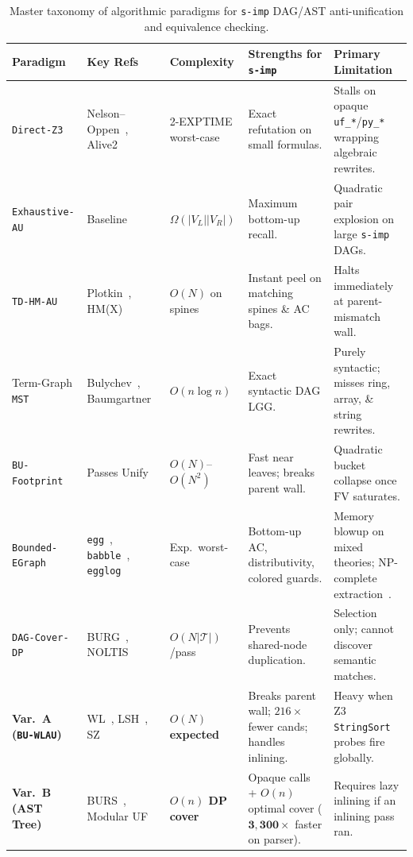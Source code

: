 \documentclass[11pt,a4paper]{article}
\begin{document}
\begin{table}[!htbp]
\centering
\caption{Master taxonomy of algorithmic paradigms for \texttt{s-imp} DAG/AST anti-unification and equivalence checking.}
\label{tab:taxonomy}
\footnotesize
\begin{tabularx}{\linewidth}{@{}p{2.9cm}p{2.5cm}p{2.2cm}p{3.5cm}X@{}}
\toprule
\textbf{Paradigm} & \textbf{Key Refs} & \textbf{Complexity} & \textbf{Strengths for \texttt{s-imp}} & \textbf{Primary Limitation} \\
\midrule
\texttt{Direct-Z3} & Nelson--Oppen~\cite{nelson1979}, Alive2~\cite{lopes2021} & 2-EXPTIME worst-case & Exact refutation on small formulas. & Stalls on opaque \texttt{uf\_*}/\texttt{py\_*} wrapping algebraic rewrites. \\
\texttt{Exhaustive-AU} & Baseline & $\Omega(|V_L||V_R|)$ & Maximum bottom-up recall. & Quadratic pair explosion on large \texttt{s-imp} DAGs. \\
\texttt{TD-HM-AU} & Plotkin~\cite{plotkin1970}, HM(X)~\cite{odersky1999} & $O(N)$ on spines & Instant peel on matching spines \& AC bags. & Halts immediately at parent-mismatch wall. \\
Term-Graph \texttt{MST} & Bulychev~\cite{bulychev2009}, Baumgartner~\cite{baumgartner2018} & $O(n \log n)$ & Exact syntactic DAG LGG. & Purely syntactic; misses ring, array, \& string rewrites. \\
\texttt{BU-Footprint} & Passes Unify & $O(N)$--$O(N^2)$ & Fast near leaves; breaks parent wall. & Quadratic bucket collapse once $\mathrm{FV}$ saturates. \\
\texttt{Bounded-EGraph} & \texttt{egg}~\cite{willsey2021}, \texttt{babble}~\cite{cao2023}, \texttt{egglog}~\cite{zhang2023egglog} & Exp.\ worst-case & Bottom-up AC, distributivity, colored guards. & Memory blowup on mixed theories; NP-complete extraction~\cite{zhang2023extract}. \\
\texttt{DAG-Cover-DP} & BURG~\cite{fraser1992}, NOLTIS~\cite{koes2008} & $O(N|\mathcal{T}|)$/pass & Prevents shared-node duplication. & Selection only; cannot discover semantic matches. \\
\textbf{Var.~A (\texttt{BU-WLAU})} & WL~\cite{shervashidze2011}, LSH~\cite{jiang2007}, SZ~\cite{schwartz1980} & \textbf{$O(N)$ expected} & Breaks parent wall; $216\times$ fewer cands; handles inlining. & Heavy when Z3 \texttt{StringSort} probes fire globally. \\
\textbf{Var.~B (AST Tree)} & BURS~\cite{proebsting1995}, Modular UF & \textbf{$O(n)$ DP cover} & Opaque calls + $O(n)$ optimal cover ($\mathbf{3{,}300\times}$ faster on parser). & Requires lazy inlining if an inlining pass ran. \\
\bottomrule
\end{tabularx}
\end{table}
\end{document}
